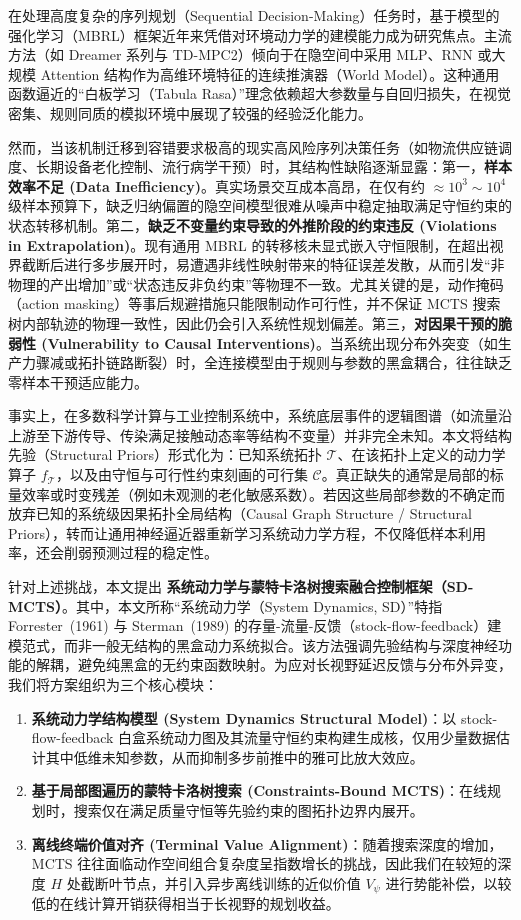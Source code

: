 \documentclass[UTF8]{ctexart}
\begin{document}
在处理高度复杂的序列规划（Sequential Decision-Making）任务时，基于模型的强化学习（MBRL）框架近年来凭借对环境动力学的建模能力成为研究焦点。主流方法（如 Dreamer 系列与 TD-MPC2）倾向于在隐空间中采用 MLP、RNN 或大规模 Attention 结构作为高维环境特征的连续推演器（World Model）。这种通用函数逼近的``白板学习（Tabula Rasa）''理念依赖超大参数量与自回归损失，在视觉密集、规则同质的模拟环境中展现了较强的经验泛化能力。

然而，当该机制迁移到容错要求极高的现实高风险序列决策任务（如物流供应链调度、长期设备老化控制、流行病学干预）时，其结构性缺陷逐渐显露：第一，\textbf{样本效率不足 (Data Inefficiency)}。真实场景交互成本高昂，在仅有约 \(\approx 10^3 \sim 10^4\) 级样本预算下，缺乏归纳偏置的隐空间模型很难从噪声中稳定抽取满足守恒约束的状态转移机制。第二，\textbf{缺乏不变量约束导致的外推阶段的约束违反 (Violations in Extrapolation)}。现有通用 MBRL 的转移核未显式嵌入守恒限制，在超出视界截断后进行多步展开时，易遭遇非线性映射带来的特征误差发散，从而引发``非物理的产出增加''或``状态违反非负约束''等物理不一致。尤其关键的是，动作掩码（action masking）等事后规避措施只能限制动作可行性，并不保证 MCTS 搜索树内部轨迹的物理一致性，因此仍会引入系统性规划偏差。第三，\textbf{对因果干预的脆弱性 (Vulnerability to Causal Interventions)}。当系统出现分布外突变（如生产力骤减或拓扑链路断裂）时，全连接模型由于规则与参数的黑盒耦合，往往缺乏零样本干预适应能力。

事实上，在多数科学计算与工业控制系统中，系统底层事件的逻辑图谱（如流量沿上游至下游传导、传染满足接触动态率等结构不变量）并非完全未知。本文将结构先验（Structural Priors）形式化为：已知系统拓扑 \(\mathcal{T}\)、在该拓扑上定义的动力学算子 \(f_{\mathcal{T}}\)，以及由守恒与可行性约束刻画的可行集 \(\mathcal{C}\)。真正缺失的通常是局部的标量效率或时变残差（例如未观测的老化敏感系数）。若因这些局部参数的不确定而放弃已知的系统级因果拓扑全局结构（Causal Graph Structure / Structural Priors），转而让通用神经逼近器重新学习系统动力学方程，不仅降低样本利用率，还会削弱预测过程的稳定性。

针对上述挑战，本文提出 \textbf{系统动力学与蒙特卡洛树搜索融合控制框架（SD-MCTS）}。其中，本文所称“系统动力学（System Dynamics, SD）”特指 Forrester~(1961) 与 Sterman~(1989) 的存量-流量-反馈（stock-flow-feedback）建模范式，而非一般无结构的黑盒动力系统拟合。该方法强调先验结构与深度神经功能的解耦，避免纯黑盒的无约束函数映射。为应对长视野延迟反馈与分布外异变，我们将方案组织为三个核心模块：

\begin{enumerate}
\item \textbf{系统动力学结构模型 (System Dynamics Structural Model)}：以 stock-flow-feedback 白盒系统动力图及其流量守恒约束构建生成核，仅用少量数据估计其中低维未知参数，从而抑制多步前推中的雅可比放大效应。
\item \textbf{基于局部图遍历的蒙特卡洛树搜索 (Constraints-Bound MCTS)}：在线规划时，搜索仅在满足质量守恒等先验约束的图拓扑边界内展开。
\item \textbf{离线终端价值对齐 (Terminal Value Alignment)}：随着搜索深度的增加，MCTS 往往面临动作空间组合复杂度呈指数增长的挑战，因此我们在较短的深度 \(H\) 处截断叶节点，并引入异步离线训练的近似价值 \(V_{\psi}\) 进行势能补偿，以较低的在线计算开销获得相当于长视野的规划收益。
\end{enumerate}
\end{document}
